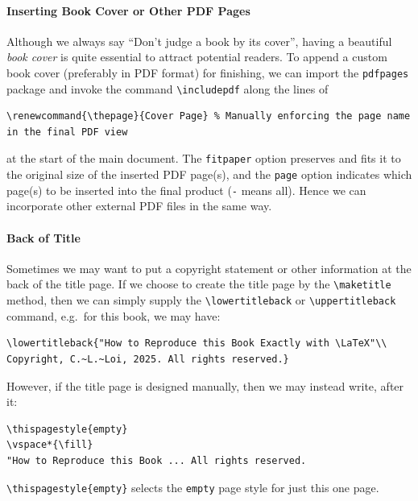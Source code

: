 \paragraph{Inserting Book Cover or Other PDF Pages} Although we always say “Don't judge a book by its cover”, having a beautiful \textit{book cover} is quite essential to attract potential readers. To append a custom book cover (preferably in PDF format) for finishing, we can import the \texttt{pdfpages} package and invoke the command \texttt{\textbackslash includepdf} along the lines of
\begin{lstlisting}
\renewcommand{\thepage}{Cover Page} % Manually enforcing the page name in the final PDF view

\end{lstlisting}
at the start of the main document. The \texttt{fitpaper} option preserves and fits it to the original size of the inserted PDF page(s), and the \texttt{page} option indicates which page(s) to be inserted into the final product (\texttt{-} means all). Hence we can incorporate other external PDF files in the same way.

\paragraph{Back of Title} Sometimes we may want to put a copyright statement or other information at the back of the title page. If we choose to create the title page by the \texttt{\textbackslash maketitle} method, then we can simply supply the \texttt{\textbackslash lowertitleback} or \texttt{\textbackslash uppertitleback} command, e.g.\ for this book, we may have:
\begin{lstlisting}
\lowertitleback{"How to Reproduce this Book Exactly with \LaTeX"\\
Copyright, C.~L.~Loi, 2025. All rights reserved.}    
\end{lstlisting}
However, if the title page is designed manually, then we may instead write, after it:
\begin{lstlisting}
\thispagestyle{empty}
\vspace*{\fill}
"How to Reproduce this Book ... All rights reserved.
\end{lstlisting}
\texttt{\textbackslash thispagestyle\{empty\}} selects the \texttt{empty} page style for just this one page.

